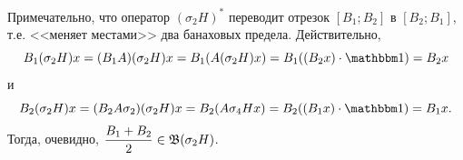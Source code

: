 Примечательно, что
	оператор $(\sigma_2 H)^*$ переводит отрезок $[B_1; B_2]$ в $[B_2; B_1]$,
	т.е. <<меняет местами>> два банаховых предела.
	Действительно,
	\begin{equation}
		B_1 (\sigma_2 H)x  = (B_1 A) (\sigma_2 H)x = B_1 (A(\sigma_2 H)x)  = B_1 ((B_2 x) \cdot \one) = B_2 x
	\end{equation}
	и
	\begin{equation}
		B_2 (\sigma_2 H)x  = (B_2 A\sigma_2) (\sigma_2 H)x = B_2 (A\sigma_4 Hx)  = B_2 ((B_1 x) \cdot \one) = B_1 x
		.
	\end{equation}
	Тогда, очевидно, $\dfrac{B_1 + B_2}2 \in \mathfrak{B}(\sigma_2 H)$.
